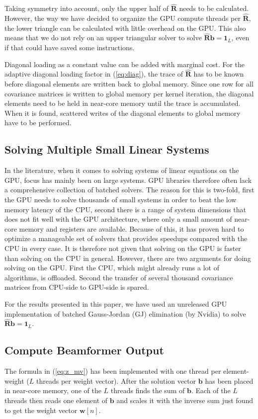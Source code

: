 \documentclass[conference]{IEEEtran}
\newcommand{\mat}[1]{\mathbf{#1}}
\renewcommand{\vec}[1]{\mathbf{#1}}
\begin{document}
Taking symmetry into account, only the upper half of $\mat{\hat{R}}$ needs to be calculated. However, the way we have decided to organize the GPU compute threads per $\mat{\hat{R}}$, the lower triangle can be calculated with little overhead on the GPU. This also means that we do not rely on an upper triangular solver to solve $\mat{\hat{R}}\vec{b} = \vec{1}_L$, even if that could have saved some instructions.

Diagonal loading as a constant value can be added with marginal cost. For the adaptive diagonal loading factor in (\ref{eq:diag}), the trace of $\mat{\hat{R}}$ has to be known before diagonal elements are written back to global memory. Since one row for all covariance matrices is written to global memory per kernel iteration, the diagonal elements need to be held in near-core memory until the trace is accumulated. When it is found, scattered writes of the diagonal elements to global memory have to be performed. 

\subsection{Solving Multiple Small Linear Systems}
In the literature, when it comes to solving systems of linear equations on the GPU, focus has mainly been on large systems. GPU libraries therefore often lack a comprehensive collection of batched solvers. The reason for this is two-fold, first the GPU needs to solve thousands of small systems in order to beat the low memory latency of the CPU, second there is a range of system dimensions that does not fit well with the GPU architecture, where only a small amount of near-core memory and registers are available. Because of this, it has proven hard to optimize a manageable set of solvers that provides speedups compared with the CPU in every case. It is therefore not given that solving on the GPU is faster than solving on the CPU in general. However, there are two arguments for doing solving on the GPU. First the CPU, which might already runs a lot of algorithms, is offloaded. Second the transfer of several thousand covariance matrices from CPU-side to GPU-side is spared.

For the results presented in this paper, we have used an unreleased GPU implementation of batched Gauss-Jordan (GJ) elimination (by Nvidia) to solve $\mat{\hat{R}}\vec{b} = \vec{1}_L$.

\subsection{Compute Beamformer Output}
The formula in (\ref{eq:z_mv}) has been implemented with one thread per element-weight ($L$ threads per weight vector). After the solution vector $\vec{b}$ has been placed in near-core memory, one of the $L$ threads finds the sum of $\vec{b}$. Each of the $L$ threads then reads one element of $\vec{b}$ and scales it with the inverse sum just found to get the weight vector $\vec{w}[n]$. 
\end{document}
